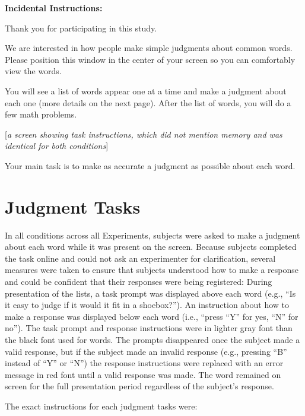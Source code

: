 \documentclass[man,natbib,floatsintext]{apa6} %
\begin{document}
\textbf{Incidental Instructions:}

\begin{displayquote}
        Thank you for participating in this study.

        We are interested in how people make simple judgments about common words.
        Please position this window in the center of your screen so you can comfortably view the words.

        You will see a list of words appear one at a time and make a judgment about each one
        (more details on the next page). After the list of words, you will do a few math problems.
        
        [\textit{a screen showing task instructions, which did not mention memory and was identical for both conditions}]

        Your main task is to make as accurate a judgment as possible about each word.
\end{displayquote}

\section{Judgment Tasks} 
In all conditions across all Experiments, subjects were asked to make a judgment about each word while it was present on the screen. Because subjects completed the task online and could not ask an experimenter for clarification, several measures were taken to ensure that subjects understood how to make a response and could be confident that their responses were being registered: During presentation of the lists, a task prompt was displayed above each word (e.g., ``Is it easy to judge if it would it fit in a shoebox?''). An instruction about how to make a response was displayed below each word (i.e., ``press ``Y'' for yes, ``N'' for no''). The task prompt and response instructions were in lighter gray font than the black font used for words. The prompts disappeared once the subject made a valid response, but if the subject made an invalid response (e.g., pressing ``B'' instead of ``Y'' or ``N'') the response instructions were replaced with an error message in red font until a valid response was made. The word remained on screen for the full presentation period regardless of the subject's response.

The exact instructions for each judgment tasks were:
\end{document}
